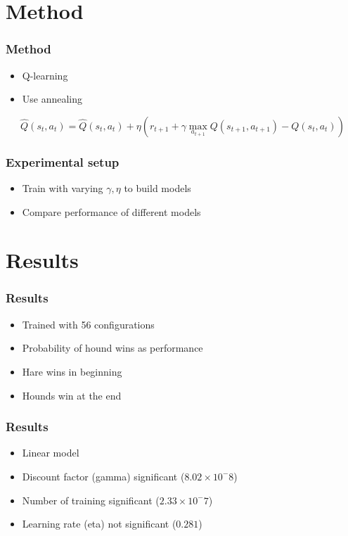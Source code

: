 \documentclass{beamer}
\begin{document}
\section{Method}
\begin{frame}
	\frametitle{Method}
	\begin{itemize}
		\item Q-learning
		\item Use annealing
	\end{itemize}
	\[ \hat{Q}(s_t, a_t) = \hat{Q}(s_t, a_t) + \eta \left(r_{t+1} + \gamma \max_{a_{t+1}} Q(s_{t+1}, a_{t+1}) - Q(s_t, a_t)\right) \]
\end{frame}

\begin{frame}
	\frametitle{Experimental setup}
	\begin{itemize}
		\item Train with varying $\gamma, \eta$ to build models
		\item Compare performance of different models
	\end{itemize}
\end{frame}

\section{Results}
\begin{frame}
    \frametitle{Results}
    \begin{itemize}
        \item Trained with 56 configurations
        \item Probability of hound wins as performance

            \phantom{M}

        \item Hare wins in beginning
        \item Hounds win at the end
    \end{itemize}
\end{frame}

\begin{frame}
    \frametitle{Results}
    \begin{itemize}[<+->]
        \item Linear model
        \item Discount factor (gamma) significant ($8.02 \times 10^-8$)
        \item Number of training significant ($2.33 \times 10^-7$)
        \item Learning rate (eta) not significant ($0.281$)
    \end{itemize}
\end{frame}
\end{document}
